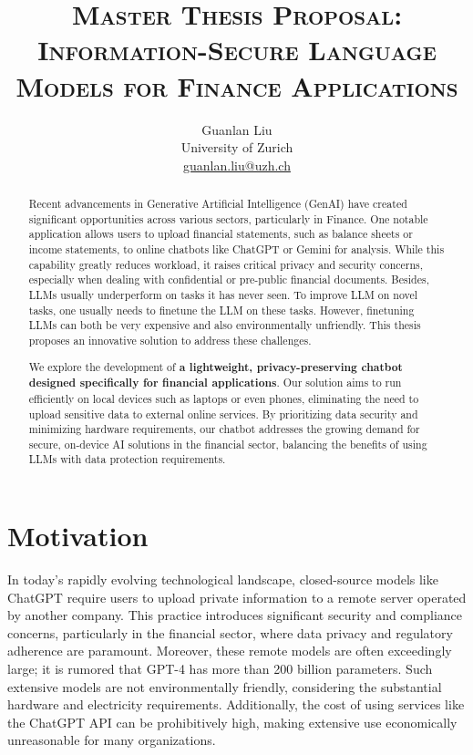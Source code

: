 \documentclass[11pt, a4paper]{article}
\title{\LARGE \bfseries\textsc {Master Thesis Proposal: Information-Secure Language Models for Finance Applications}}
\author{Guanlan Liu \\ University of Zurich \\ \href{mailto:guanlan.liu@uzh.ch}{guanlan.liu@uzh.ch}}
\date{}
\begin{document}
  \maketitle%
  \thispagestyle{fancy}

\begin{abstract}

Recent advancements in Generative Artificial Intelligence (GenAI) have created significant opportunities across various sectors, particularly in Finance. One notable application allows users to upload financial statements, such as balance sheets or income statements, to online chatbots like ChatGPT or Gemini for analysis. While this capability greatly reduces workload, it raises critical privacy and security concerns, especially when dealing with confidential or pre-public financial documents. Besides, LLMs usually underperform on tasks it has never seen. To improve LLM on novel tasks, one usually needs to finetune the LLM on these tasks. However, finetuning LLMs can both be very expensive and also environmentally unfriendly. This thesis proposes an innovative solution to address these challenges. 

We explore the development of \textbf{a lightweight, privacy-preserving chatbot designed specifically for financial applications}. Our solution aims to run efficiently on local devices such as laptops or even phones, eliminating the need to upload sensitive data to external online services. By prioritizing data security and minimizing hardware requirements, our chatbot addresses the growing demand for secure, on-device AI solutions in the financial sector, balancing the benefits of using LLMs with data protection requirements. 

\end{abstract}

\section{Motivation}

In today's rapidly evolving technological landscape, closed-source models like ChatGPT require users to upload private information to a remote server operated by another company. This practice introduces significant security and compliance concerns, particularly in the financial sector, where data privacy and regulatory adherence are paramount. Moreover, these remote models are often exceedingly large; it is rumored that GPT-4 has more than 200 billion parameters. Such extensive models are not environmentally friendly, considering the substantial hardware and electricity requirements. Additionally, the cost of using services like the ChatGPT API can be prohibitively high, making extensive use economically unreasonable for many organizations.
\end{document}
